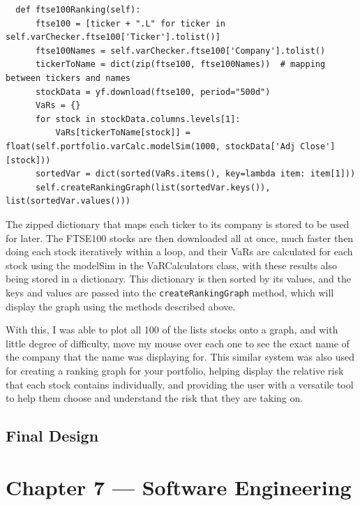 \documentclass{article}
\begin{document}
\begin{verbatim}
  def ftse100Ranking(self):
      ftse100 = [ticker + ".L" for ticker in self.varChecker.ftse100['Ticker'].tolist()]
      ftse100Names = self.varChecker.ftse100['Company'].tolist()
      tickerToName = dict(zip(ftse100, ftse100Names))  # mapping between tickers and names
      stockData = yf.download(ftse100, period="500d")
      VaRs = {}
      for stock in stockData.columns.levels[1]:
          VaRs[tickerToName[stock]] = float(self.portfolio.varCalc.modelSim(1000, stockData['Adj Close'][stock])) 
      sortedVar = dict(sorted(VaRs.items(), key=lambda item: item[1]))
      self.createRankingGraph(list(sortedVar.keys()), list(sortedVar.values()))
\end{verbatim}

\vspace{0.3cm}
The zipped dictionary that maps each ticker to its company is stored to be used for later. The FTSE100 stocks are then downloaded all at once, much faster then doing each stock iteratively within a loop, and their VaRs are calculated for each stock using the modelSim in the VaRCalculators class, with these results also being stored in a dictionary. This dictionary is then sorted by its values, and the keys and values are passed into the \texttt{createRankingGraph} method, which will display the graph using the methods described above.\\\vspace{0.3cm}

With this, I was able to plot all 100 of the lists stocks onto a graph, and with little degree of difficulty, move my mouse over each one to see the exact name of the company that the name was displaying for. This similar system was also used for creating a ranking graph for your portfolio, helping display the relative risk that each stock contains individually, and providing the user with a versatile tool to help them choose and understand the risk that they are taking on.\\\vspace{0.3cm}


\subsection{Final Design}



\section{Chapter 7 --- Software Engineering}
\end{document}
